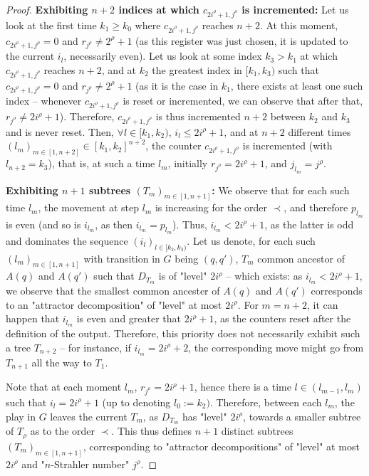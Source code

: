 \documentclass[a4paper,UKenglish,cleveref, autoref, thm-restate]{lipics-v2021}
\renewcommand{\leq}{\leqslant}
\renewcommand{\geq}{\geqslant}
\begin{document}
\begin{proof}
	\textbf{Exhibiting $n+2$ indices at which $c_{2i^\rho +1, j^\rho}$ is incremented:} Let us look at the first time $k_1\geq k_0$ where $c_{2i^\rho +1, j^\rho}$ reaches $n+2$. At this moment, $c_{2i^\rho +1, j^\rho}=0$ and $r_{j^\rho} \neq 2^\rho+1$ (as this register was just chosen, it is updated to the current $i_l$, necessarily even). Let us look at some index $k_3> k_1$ at which $c_{2i^\rho +1, j^\rho}$ reaches $n+2$, and at $k_2$ the greatest index in $[k_1,k_3)$ such that $c_{2i^\rho +1, j^\rho}=0$ and $r_{j^\rho} \neq 2^\rho+1$ (as it is the case in $k_1$, there exists at least one such index – whenever $c_{2i^\rho +1, j^\rho}$ is reset or incremented, we can observe that after that, $r_{j^\rho}\neq 2i^\rho +1$). Therefore, $c_{2i^\rho +1, j^\rho}$ is thus incremented $n+2$ between $k_2$ and $k_3$ and is never reset. Then, $\forall l \in [k_1,k_2)$, $i_l\leq 2i^\rho+1$, and at $n+2$ different times $(l_m)_{m\in [1,n+2]} \in [k_1,k_2]^{n+2}$, the counter $c_{2i^\rho+1,j^\rho}$ is incremented (with $l_{n+2}=k_3$), that is, at such a time $l_m$, initially $r_{j^\rho}=2i^\rho+1$, and $j_{l_m} = j^\rho$.
	
	\textbf{Exhibiting $n+1$ subtrees $(T_m)_{m\in [1,n+1]}$:} We observe that for each such time $l_m$, the movement at step $l_{m}$ is increasing for the order $\prec$, and therefore $p_{l_m}$ is even (and so is $i_{l_m}$, as then $i_{l_m} = p_{l_m}$). Thus, $i_{l_m} < 2i^\rho+1$, as the latter is odd and dominates the sequence $(i_l)_{l\in [k_2,k_3)}$. Let us denote, for each such $(l_m)_{m\in [1,n+1]}$ with transition in $G$ being $(q,q')$, $T_m$ common ancestor of $A(q)$ and $A(q')$ such that $D_{T_m}$ is of "level" $2i^\rho$ – which exists: as $i_{l_m} < 2i^\rho+1$, we observe that the smallest common ancester of $A(q)$ and $A(q')$ corresponds to an "attractor decomposition" of "level" at most $2i^\rho$.
	For $m = n + 2$, it can happen that $i_{l_m}$ is even and greater that $2i^\rho + 1$, as the counters reset after the definition of the output. Therefore, this priority does not necessarily exhibit such a tree $T_{n+2}$ -- for instance, if $i_{l_m} = 2i^\rho+2$, the corresponding move might go from $T_{n+1}$ all the way to $T_1$. 
	
	Note that at each moment $l_m$, $r_{j^\rho}=2i^\rho+1$, hence there is a time $l \in (l_{m-1},l_m)$ such that $i_l = 2i^\rho+1$ (up to denoting $l_0 := k_2)$.
	Therefore, between each $l_m$, the play in $G$ leaves the current $T_m$, as $D_{T_m}$ has "level" $2i^\rho$, towards a smaller subtree of $T_\rho$ as to the order $\prec$. This thus defines $n+1$ distinct subtrees $(T_m)_{m\in [1,n+1]}$, corresponding to "attractor decompositions" of "level" at most $2i^\rho$ and "$n$-Strahler number" $j^\rho$.
	

\end{proof}
\end{document}
